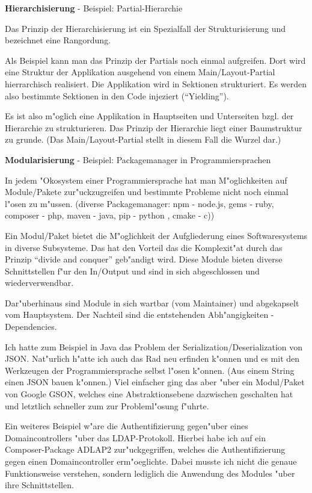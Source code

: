 \textbf{Hierarchisierung}
- Beispiel: Partial-Hierarchie

Das Prinzip der Hierarchisierung ist ein Spezialfall der Strukturisierung und bezeichnet eine Rangordung.

Als Beispiel kann man das Prinzip der Partials noch einmal aufgreifen. Dort wird eine Struktur der Applikation ausgehend von einem Main/Layout-Partial hierrarchisch realisiert.
Die Applikation wird in Sektionen strukturiert. Es werden also bestimmte Sektionen in den Code injeziert (``Yielding'').

Es ist also m"oglich eine Applikation in Hauptseiten und Unterseiten bzgl. der Hierarchie zu strukturieren.
Das Prinzip der Hierarchie liegt einer Baumstruktur zu grunde. (Das Main/Layout-Partial stellt in diesem Fall die Wurzel dar.)

\newpage
\textbf{Modularisierung}
- Beispiel: Packagemanager in Programmiersprachen

In jedem "Okosystem einer Programmiersprache hat man M"oglichkeiten auf Module/Pakete zur"uckzugreifen und bestimmte Probleme nicht noch einmal l"osen zu m"ussen. (diverse Packagemanager: npm - node.js, gems - ruby, composer - php, maven - java, pip - python , cmake - c))

Ein Modul/Paket bietet die M"oglichkeit der Aufgliederung eines Softwaresystems in diverse Subsysteme. Das hat den Vorteil das die Komplexit"at durch das Prinzip ``divide and conquer'' geb"andigt wird.
Diese Module bieten diverse Schnittstellen f"ur den In/Output und sind in sich abgeschlossen und wiederverwendbar.

Dar"uberhinaus sind Module in sich wartbar (vom Maintainer) und abgekapselt vom Hauptsystem. Der Nachteil sind die entstehenden Abh"angigkeiten - Dependencies.

Ich hatte zum Beispiel in Java das Problem der Serialization/Deserialization von JSON.
Nat"urlich h"atte ich auch das Rad neu erfinden k"onnen und es mit den Werkzeugen der Programmiersprache selbst l"osen k"onnen. (Aus einem String einen JSON bauen k"onnen.)
Viel einfacher ging das aber "uber ein Modul/Paket von Google GSON, welches eine Abstraktionsebene dazwischen geschalten hat und letztlich schneller zum zur Probleml"osung f"uhrte.

Ein weiteres Beispiel w"are die Authentifizierung gegen"uber eines Domaincontrollers "uber das LDAP-Protokoll.
Hierbei habe ich auf ein Composer-Package ADLAP2 zur"uckgegriffen, welches die Authentifizierung gegen einen Domaincontroller erm"oeglichte.
Dabei musste ich nicht die genaue Funktionsweise verstehen, sondern lediglich die Anwendung des Modules "uber ihre Schnittstellen.

